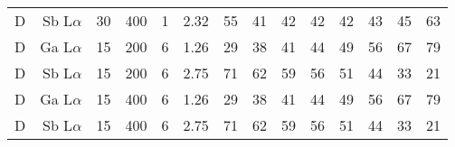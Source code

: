 \begin{table}[phtb]
\begin{center}
\begin{tabular}{rrrrrrrrrrrrrr}
            D            & Sb L$\alpha$  & 30             & 400            & 1           & 2.32              & 55             & 41           & 42            & 42             & 42             & 43             & 45            & 63             \\
            D            & Ga L$\alpha$  & 15             & 200            & 6           & 1.26              & 29             & 38           & 41            & 44             & 49             & 56             & 67            & 79             \\
            D            & Sb L$\alpha$  & 15             & 200            & 6           & 2.75              & 71             & 62           & 59            & 56             & 51             & 44             & 33            & 21             \\
            D            & Ga L$\alpha$  & 15             & 400            & 6           & 1.26              & 29             & 38           & 41            & 44             & 49             & 56             & 67            & 79             \\
            D            & Sb L$\alpha$  & 15             & 400            & 6           & 2.75              & 71             & 62           & 59            & 56             & 51             & 44             & 33            & 21             \\
            \hline
        \end{tabular}
    \end{center}
\end{table}
\restoregeometry %
